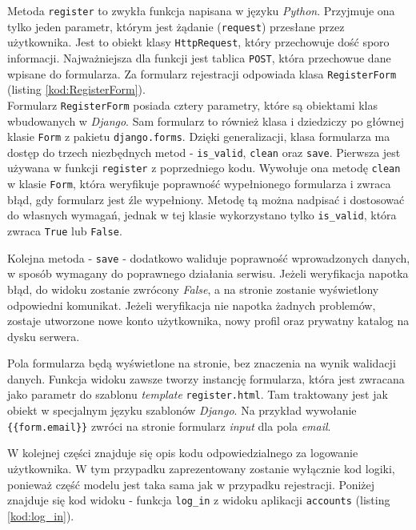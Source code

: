 \vspace{1em}
Metoda \texttt{register} to zwykła funkcja napisana w języku \emph{Python}. Przyjmuje ona tylko jeden parametr, którym jest żądanie (\texttt{request}) przesłane przez użytkownika. Jest to obiekt klasy \texttt{HttpRequest}, który przechowuje dość sporo informacji. Najważniejsza dla funkcji jest tablica \texttt{POST}, która przechowue dane wpisane do formularza. 
Za formularz rejestracji odpowiada klasa \texttt{RegisterForm} (listing \ref{kod:RegisterForm}).\\



\vspace{1em}
Formularz \texttt{RegisterForm} posiada cztery parametry, które są obiektami klas wbudowanych w \emph{Django}. Sam formularz to również klasa i dziedziczy po głównej klasie \texttt{Form} z pakietu \texttt{django.forms}. Dzięki generalizacji, klasa formularza ma dostęp do trzech niezbędnych metod - \texttt{is\_valid}, \texttt{clean} oraz \texttt{save}. Pierwsza jest używana w funkcji \texttt{register} z poprzedniego kodu. Wywołuje ona metodę \texttt{clean} w klasie \texttt{Form}, która weryfikuje poprawność wypełnionego formularza i zwraca błąd, gdy formularz jest źle wypełniony. Metodę tą można nadpisać i dostosować do własnych wymagań, jednak w tej klasie wykorzystano tylko \texttt{is\_valid}, która zwraca \texttt{True} lub \texttt{False}.

Kolejna metoda - \texttt{save} - dodatkowo waliduje poprawność wprowadzonych danych, w sposób wymagany do poprawnego działania serwisu. Jeżeli weryfikacja napotka błąd, do widoku zostanie zwrócony \emph{False}, a na stronie zostanie wyświetlony odpowiedni komunikat. Jeżeli weryfikacja nie napotka żadnych problemów, zostaje utworzone nowe konto użytkownika, nowy profil oraz prywatny katalog na dysku serwera.

Pola formularza będą wyświetlone na stronie, bez znaczenia na wynik walidacji danych. Funkcja widoku zawsze tworzy instancję formularza, która jest zwracana jako parametr do szablonu \emph{template} \texttt{register.html}. Tam traktowany jest jak obiekt w specjalnym języku szablonów \emph{Django}. Na przykład wywołanie \texttt{\{\{form.email\}\}} zwróci na stronie formularz \emph{input} dla pola \emph{e\-mail}.

W kolejnej części znajduje się opis kodu odpowiedzialnego za logowanie użytkownika. W tym przypadku zaprezentowany zostanie wyłącznie kod logiki, ponieważ część modelu jest taka sama jak w przypadku rejestracji. Poniżej znajduje się kod widoku - funkcja \texttt{log\_in} z widoku aplikacji \texttt{accounts} (listing \ref{kod:log_in}).\\

